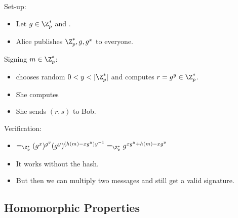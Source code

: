 \begin{frame}
  \begin{definition}
    Set-up:
    \begin{itemize}
      \item Let \(g\in \Z_p^*\) and .
      \item Alice publishes \(\Z_p^*, g, g^x\) to everyone.
    \end{itemize}
    Signing \(m\in \Z_p^*\):
    \begin{itemize}
      \item {} chooses random \(0 < y < |\Z_p^*|\) and computes 
        \(r = g^y\in \Z_p^*\).
      \item She computes 
      \item She sends \((r, s)\) to Bob.
    \end{itemize}
    Verification:
    \begin{itemize}
      \item {}\( =_{\Z_p^*}
          (g^x)^{g^y} (g^y)^{(h(m) - xg^y)y^{-1}} =_{\Z_p^*}
          g^{xg^y + h(m) - xg^y}\)
    \end{itemize}
  \end{definition}
\end{frame}

\begin{frame}
  \begin{remark}
    \begin{itemize}
      \item It works without the hash.
      \item But then we can multiply two messages and still get a valid 
        signature.
    \end{itemize}
  \end{remark}
\end{frame}

\subsection{Homomorphic Properties}

